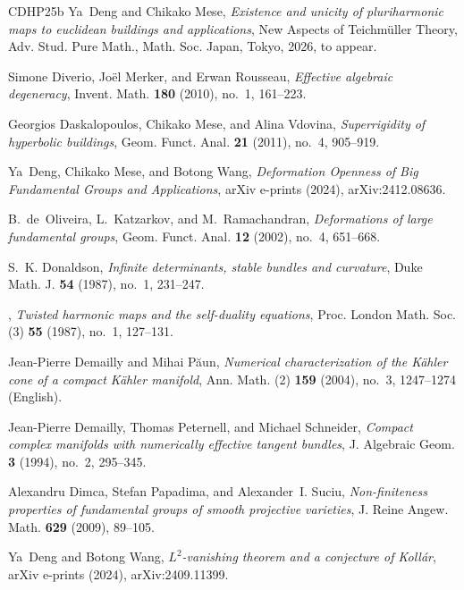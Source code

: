 \documentclass[english]{amsproc}
\theoremstyle{plain}
\theoremstyle{definition}
\theoremstyle{remark}
\theoremstyle{plain}
\numberwithin{equation}{thm} %
\begin{document}
\begin{thebibliography}{CDHP25b}
		Ya~{Deng} and Chikako {Mese}, \emph{Existence and unicity of pluriharmonic maps
			to euclidean buildings and applications}, New Aspects of Teichmüller Theory,
		Adv. Stud. Pure Math., Math. Soc. Japan, Tokyo, 2026, to appear.
		
		Simone Diverio, Jo\"el Merker, and Erwan Rousseau, \emph{Effective algebraic
			degeneracy}, Invent. Math. \textbf{180} (2010), no.~1, 161--223. 
		
		Georgios Daskalopoulos, Chikako Mese, and Alina Vdovina, \emph{Superrigidity of
			hyperbolic buildings}, Geom. Funct. Anal. \textbf{21} (2011), no.~4,
		905--919. 
		
		Ya~{Deng}, Chikako {Mese}, and Botong {Wang}, \emph{{Deformation Openness of
				Big Fundamental Groups and Applications}}, arXiv e-prints (2024),
		arXiv:2412.08636.
		
		B.~de~Oliveira, L.~Katzarkov, and M.~Ramachandran, \emph{Deformations of large
			fundamental groups}, Geom. Funct. Anal. \textbf{12} (2002), no.~4, 651--668.
		
		S.~K. Donaldson, \emph{Infinite determinants, stable bundles and curvature},
		Duke Math. J. \textbf{54} (1987), no.~1, 231--247. 
		
		\bysame, \emph{Twisted harmonic maps and the self-duality equations}, Proc.
		London Math. Soc. (3) \textbf{55} (1987), no.~1, 127--131. 
		
		Jean-Pierre Demailly and Mihai P{\u{a}}un, \emph{Numerical characterization of
			the {K{\"a}hler} cone of a compact {K{\"a}hler} manifold}, Ann. Math. (2)
		\textbf{159} (2004), no.~3, 1247--1274 (English).
		
		Jean-Pierre Demailly, Thomas Peternell, and Michael Schneider, \emph{Compact
			complex manifolds with numerically effective tangent bundles}, J. Algebraic
		Geom. \textbf{3} (1994), no.~2, 295--345. 
		
		Alexandru Dimca, Stefan Papadima, and Alexander~I. Suciu, \emph{Non-finiteness
			properties of fundamental groups of smooth projective varieties}, J. Reine
		Angew. Math. \textbf{629} (2009), 89--105. 
		
		Ya~{Deng} and Botong {Wang}, \emph{{$L^2$-vanishing theorem and a conjecture of
				Koll{\'a}r}}, arXiv e-prints (2024), arXiv:2409.11399.
		

\end{thebibliography}
\end{document}
